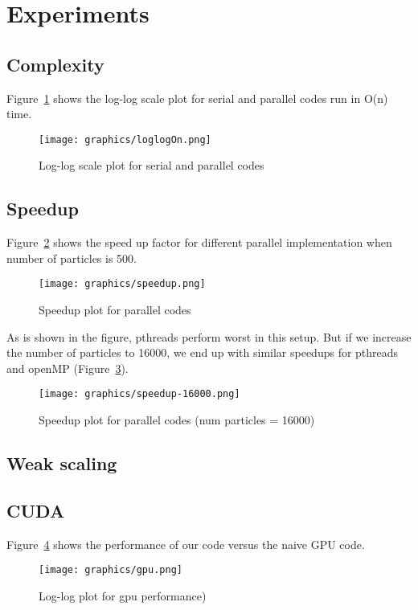 \documentclass[11pt]{article}
\begin{document}
\section{Experiments}
\subsection{Complexity}
Figure~\ref{fig:loglogOn} shows the log-log scale plot for serial and parallel codes run in O(n) time.

\begin{figure}[htb]
  \centering
  \texttt{[image: graphics/loglogOn.png]}
  \caption{Log-log scale plot for serial and parallel codes}
  \label{fig:loglogOn}
\end{figure}

\subsection{Speedup}
Figure~\ref{fig:speedup} shows the speed up factor for different parallel implementation when number of particles is 500.
\begin{figure}[htb]
  \centering
  \texttt{[image: graphics/speedup.png]}
  \caption{Speedup plot for parallel codes}
  \label{fig:speedup}
\end{figure}

As is shown in the figure, pthreads perform worst in this setup. But if we increase the number of particles to 16000,
we end up with similar speedups for pthreads and openMP (Figure~\ref{fig:speedup-16000}).
\begin{figure}[htb]
  \centering
  \texttt{[image: graphics/speedup-16000.png]}
  \caption{Speedup plot for parallel codes (num particles = 16000)}
  \label{fig:speedup-16000}
\end{figure}

\subsection{Weak scaling}

\subsection{CUDA}
Figure~\ref{fig:gpu} shows the performance of our code versus the naive GPU code.
\begin{figure}[htb]
  \centering
  \texttt{[image: graphics/gpu.png]}
  \caption{Log-log plot for gpu performance)}
  \label{fig:gpu}
\end{figure}
\end{document}
